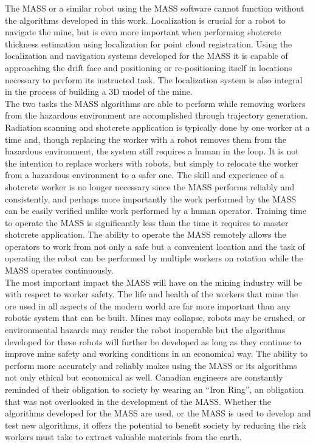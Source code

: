 The MASS or a similar robot using the MASS software cannot function without the algorithms developed in this work. Localization is crucial for a robot to navigate the mine, but is even more important when performing shotcrete thickness estimation using localization for point cloud registration. Using the localization and navigation systems developed for the MASS it is capable of approaching the drift face and positioning or re-positioning itself in locations necessary to perform its instructed task. The localization system is also integral in the process of building a 3D model of the mine.\\

The two tasks the MASS algorithms are able to perform while removing workers from the hazardous environment are accomplished through trajectory generation. Radiation scanning and shotcrete application is typically done by one worker at a time and, though replacing the worker with a robot removes them from the hazardous environment, the system still requires a human in the loop. It is not the intention to replace workers with robots, but simply to relocate the worker from a hazardous environment to a safer one. The skill and experience of a shotcrete worker is no longer necessary since the MASS performs reliably and consistently, and perhaps more importantly the work performed by the MASS can be easily verified unlike work performed by a human operator. Training time to operate the MASS is significantly less than the time it requires to master shotcrete application. The ability to operate the MASS remotely allows the operators to work from not only a safe but a convenient location and the task of operating the robot can be performed by multiple workers on rotation while the MASS operates continuously.\\

The most important impact the MASS will have on the mining industry will be with respect to worker safety. The life and health of the workers that mine the ore used in all aspects of the modern world are far more important than any robotic system that can be built. Mines may collapse, robots may be crushed, or environmental hazards may render the robot inoperable but the algorithms developed for these robots will further be developed as long as they continue to improve mine safety and working conditions in an economical way. The ability to perform more accurately and reliably makes using the MASS or its algorithms not only ethical but economical as well. Canadian engineers are constantly reminded of their obligation to society by wearing an ``Iron Ring'', an obligation that was not overlooked in the development of the MASS. Whether the algorithms developed for the MASS are used, or the MASS is used to develop and test new algorithms, it offers the potential to benefit society by reducing the risk workers must take to extract valuable materials from the earth.\\

